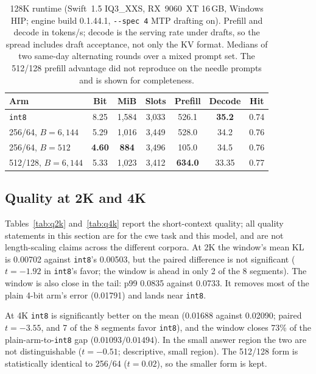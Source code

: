 \documentclass[10pt,twocolumn]{article}
\begin{document}
\begin{table}[t]
\centering
\small
\begin{tabular}{@{}lcccccc@{}}
\toprule
\textbf{Arm} & \textbf{Bit} & \textbf{MiB} & \textbf{Slots} & \textbf{Prefill} & \textbf{Decode} & \textbf{Hit} \\
\midrule
\texttt{int8} & 8.25 & 1,584 & 3,033 & 526.1 & \textbf{35.2} & 0.74 \\
256/64, $B{=}6{,}144$ & 5.29 & 1,016 & 3,449 & 528.0 & 34.2 & 0.76 \\
256/64, $B{=}512$ & \textbf{4.60} & \textbf{884} & 3,496 & 105.0 & 34.5 & 0.76 \\
512/128, $B{=}6{,}144$ & 5.33 & 1,023 & 3,412 & \textbf{634.0} & 33.35 & 0.77 \\
\bottomrule
\end{tabular}
\caption{128K runtime (Swift~1.5 IQ3\_XXS, RX~9060~XT 16\,GB, Windows HIP; engine build 0.1.44.1, \texttt{-{}-spec 4} MTP drafting on). Prefill and decode in tokens/s; decode is the serving rate under drafts, so the spread includes draft acceptance, not only the KV format. Medians of two same-day alternating rounds over a mixed prompt set. The 512/128 prefill advantage did not reproduce on the needle prompts and is shown for completeness.}
\label{tab:runtime}
\end{table}

\subsection{Quality at 2K and 4K}

Tables~\ref{tab:q2k} and~\ref{tab:q4k} report the short-context quality; all quality statements in this section are for the cwe task and this model, and are not length-scaling claims across the different corpora. At 2K the window's mean KL is 0.00702 against \texttt{int8}'s 0.00503, but the paired difference is not significant ($t=-1.92$ in \texttt{int8}'s favor; the window is ahead in only 2 of the 8 segments). The window is also close in the tail: p99 0.0835 against 0.0733. It removes most of the plain 4-bit arm's error (0.01791) and lands near \texttt{int8}.

At 4K \texttt{int8} is significantly better on the mean (0.01688 against 0.02090; paired $t=-3.55$, and 7 of the 8 segments favor \texttt{int8}), and the window closes 73\% of the plain-arm-to-\texttt{int8} gap ($0.01093/0.01494$). In the small answer region the two are not distinguishable ($t=-0.51$; descriptive, small region). The 512/128 form is statistically identical to 256/64 ($t=0.02$), so the smaller form is kept.
\end{document}
